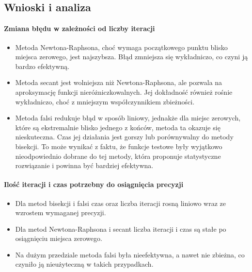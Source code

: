 \subsection{Wnioski i analiza}
\paragraph{Zmiana błędu w zależności od liczby iteracji}
\begin{itemize}
\item Metoda Newtona-Raphsona, choć wymaga początkowego punktu blisko miejsca zerowego, jest najszybsza. Błąd zmniejsza się wykładniczo, co czyni ją bardzo efektywną.
\item Metoda secant jest wolniejsza niż Newtona-Raphsona, ale pozwala na aproksymację funkcji nieróżniczkowalnych. Jej dokładność również rośnie wykładniczo, choć z mniejszym współczynnikiem zbieżności.
\item Metoda falsi redukuje błąd w sposób liniowy, jednakże dla miejsc zerowych, które są ekstremalnie blisko jednego z końców, metoda ta okazuje się nieskuteczna. Czas jej działania jest gorszy lub porównywalny do metody bisekcji. To może wynikać z faktu, że funkcje testowe były wyjątkowo nieodpowiednio dobrane do tej metody, która proponuje statystyczne rozwiązanie i powinna być bardziej efektywna.
\end{itemize}

\paragraph{Ilość iteracji i czas potrzebny do osiągnięcia precyzji}
\begin{itemize}
\item Dla metod bisekcji i falsi czas oraz liczba iteracji rosną liniowo wraz ze wzrostem wymaganej precyzji.
\item Dla metod Newtona-Raphsona i secant liczba iteracji i czas są stałe po osiągnięciu miejsca zerowego.
\item Na dużym przedziale metoda falsi była nieefektywna, a nawet nie zbieżna, co czyniło ją nieużyteczną w takich przypadkach.
\end{itemize}

